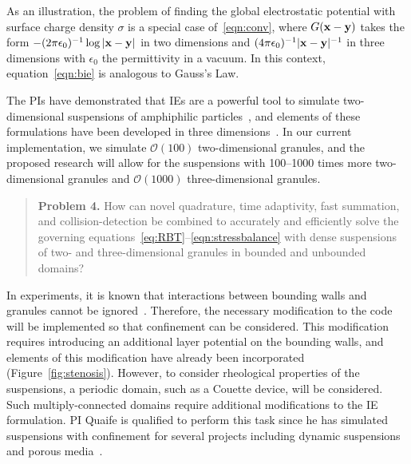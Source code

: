 As an illustration, the problem of finding the global electrostatic
potential with surface charge density $\sigma$ is a special case
of~\eqref{eqn:conv}, where $G(\mathbf{x} - \mathbf{y})$ takes the form $-(2\pi
\epsilon_0)^{-1}\log|\mathbf{x} - \mathbf{y}|$ in two dimensions and $(4\pi
\epsilon_0)^{-1}|\mathbf{x} -\mathbf{y}|^{-1}$ in three dimensions with $\epsilon_0$
the permittivity in a vacuum. In this context, equation~\eqref{eqn:bie}
is analogous to Gauss's Law.

The PIs have demonstrated that IEs are a powerful tool to simulate
two-dimensional suspensions of amphiphilic particles~\cite{Fu2018_SIAM,
FuQuRyYo22, fu-ryh-qua-you2022}, and elements of these formulations have
been developed in three dimensions~\cite{ying_2006, manasthesis,
rac-gre2016}. In our current implementation, we simulate
$\mathcal{O}(100)$ two-dimensional granules, and the proposed research
will allow for the suspensions with 100--1000 times more two-dimensional
granules and $\mathcal{O}(1000)$ three-dimensional granules. 

\begin{quotation}
  \noindent
  \textbf{Problem 4.} How can novel quadrature, time adaptivity, fast
  summation, and collision-detection be combined to accurately and
  efficiently solve the governing
  equations~\eqref{eq:RBT}--\eqref{eqn:stressbalance} with dense
  suspensions of two- and three-dimensional granules in bounded and
  unbounded domains?
\end{quotation}
In experiments, it is known that interactions between bounding walls and
granules cannot be ignored~\cite{qua-gan-you2021,
KaouiHartingMisbah2011_PRE, her-sto-gra2005}. Therefore, the necessary
modification to the code will be implemented so that confinement can be
considered. This modification requires introducing an additional layer
potential on the bounding walls, and elements of this modification have
already been incorporated (Figure~\ref{fig:stenosis}). However, to
consider rheological properties of the suspensions, a periodic domain,
such as a Couette device, will be considered. Such multiply-connected
domains require additional modifications to the IE formulation. PI
Quaife is qualified to perform this task since he has simulated
suspensions with confinement for several projects including dynamic
suspensions~\cite{qua-bir2014, bys-sha-qua2020} and porous
media~\cite{chi-moo-qua2020, dea-qua-bir-jua2018, moo-che-chi-qua2022,
qua-gan-you2021}.

